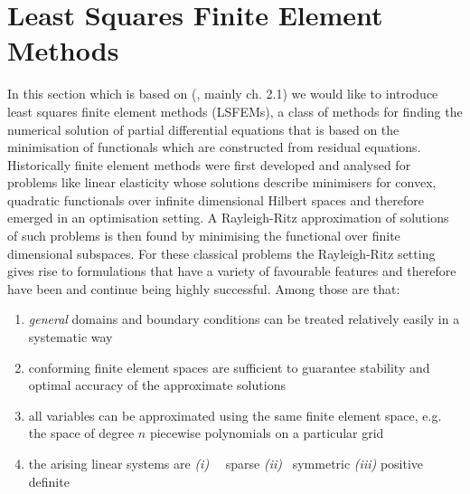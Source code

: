 \documentclass[../draft_1.tex]{subfiles}
\begin{document}
\section{Least Squares Finite Element Methods}

In this section which is based on (\cite{bochev2009least}, mainly ch. 2.1) we would like to introduce least squares finite element methods (LSFEMs), a class of methods for finding the numerical solution of partial differential equations that is based on the minimisation of functionals which are constructed from residual equations. Historically finite element methods were first developed and analysed for problems like linear elasticity whose solutions describe minimisers for convex, quadratic functionals over infinite dimensional Hilbert spaces and therefore emerged in an optimisation setting. A Rayleigh-Ritz approximation of solutions of such problems is then found by minimising the functional over finite dimensional subspaces. For these classical problems the Rayleigh-Ritz setting gives rise to formulations that have a variety of favourable features and therefore have been and continue being highly successful.  Among those are that:

\begin{enumerate}
	\item \textit{general} domains and boundary conditions can be treated relatively easily in a systematic way 
	\item conforming finite element spaces are sufficient to guarantee stability and optimal accuracy of the approximate solutions
	\item all variables can be approximated using the same finite element space, e.g. the space of degree $n$ piecewise polynomials on a particular grid
	\item the arising linear systems are 
	\subitem \textit{(i)}  \ \ sparse
	\subitem \textit{(ii)}  \ symmetric
	\subitem \textit{(iii)} positive definite
\end{enumerate}
\end{document}
